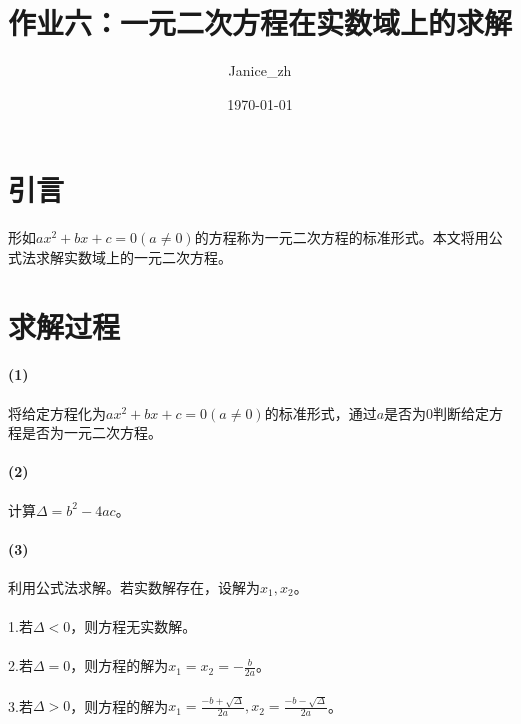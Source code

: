 \documentclass{article}
\title{作业六：一元二次方程在实数域上的求解}
\author{Janice\_zh}
\date{\today}
\begin{document}
	\maketitle   %
	\renewcommand{\contentsname}{目录}
	\tableofcontents  %
	\section{引言}
形如$ax^2+bx+c=0 (a\neq0)$的方程称为一元二次方程的标准形式。本文将用公式法求解实数域上的一元二次方程。
	\section{求解过程}
	\paragraph{(1)}将给定方程化为$ax^2+bx+c=0 (a\neq0)$的标准形式，通过$a$是否为0判断给定方程是否为一元二次方程。
	\paragraph{(2)}计算$\Delta=b^2-4ac$。
	\paragraph{(3)}利用公式法求解。若实数解存在，设解为$x_1,x_2$。
	\paragraph{}1.若$\Delta<0$，则方程无实数解。
	\paragraph{}2.若$\Delta=0$，则方程的解为$x_1=x_2=-\frac{b}{2a}$。
	\paragraph{}3.若$\Delta>0$，则方程的解为$x_1=\frac{-b+\sqrt{\Delta}}{2a},x_2=\frac{-b-\sqrt{\Delta}}{2a}$。
\end{document}
